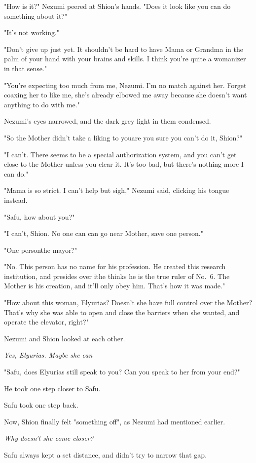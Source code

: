 "How is it?" Nezumi peered at Shion's hands. "Does it look like you can
do something about it?"

"It's not working."

"Don't give up just yet. It shouldn't be hard to have Mama or Grandma in
the palm of your hand with your brains and skills. I think you're quite
a womanizer in that sense."

"You're expecting too much from me, Nezumi. I'm no match against her.
Forget coaxing her to like me, she's already elbowed me away because she
doesn't want anything to do with me."

Nezumi's eyes narrowed, and the dark grey light in them condensed.

"So the Mother didn't take a liking to you\el are you sure you can't do
it, Shion?"

"I can't. There seems to be a special authorization system, and you
can't get close to the Mother unless you clear it. It's too bad, but\el 
there's nothing more I can do."

"Mama is so strict. I can't help but sigh," Nezumi said, clicking his
tongue instead.

"Safu, how about you?"

"I can't, Shion. No one can can go near Mother, save one person."

"One person\el the mayor?"

"No. This person has no name for his profession. He created this
research institution, and presides over it\el he thinks he is the true
ruler of No.~6. The Mother is his creation, and it'll only obey him.
That's how it was made."

"How about this woman, Elyurias? Doesn't she have full control over the
Mother? That's why she was able to open and close the barriers when she
wanted, and operate the elevator, right?"

Nezumi and Shion looked at each other.

\emph{Yes, Elyurias. Maybe she can\el }

"Safu, does Elyurias still speak to you? Can you speak to her from your
end?"

He took one step closer to Safu.

Safu took one step back.

Now, Shion finally felt "something off", as Nezumi had mentioned
earlier.

\emph{Why doesn't she come closer?}

Safu always kept a set distance, and didn't try to narrow that gap.

